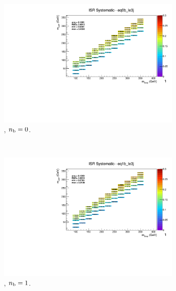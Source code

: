 \begin{figure}[ht!]
  \begin{subfigure}[b]{0.32\textwidth}
    \includegraphics[width=\textwidth, page=1]{Figs/sms/t2cc/v37/systs_v2/T2cc_ISR_eq0b_le3j.pdf}
    \caption{\njlow, $n_{\text{b}} = 0$.}
  \end{subfigure}\\
  \begin{subfigure}[b]{0.32\textwidth}
    \includegraphics[width=\textwidth, page=12]{Figs/sms/t2cc/v37/systs_v2/T2cc_ISR_eq1b_le3j.pdf}
    \caption{\njlow, $n_{\text{b}} = 1$.}
  \end{subfigure}
  \begin{subfigure}[b]{0.32\textwidth}

\end{subfigure}
\end{figure}
